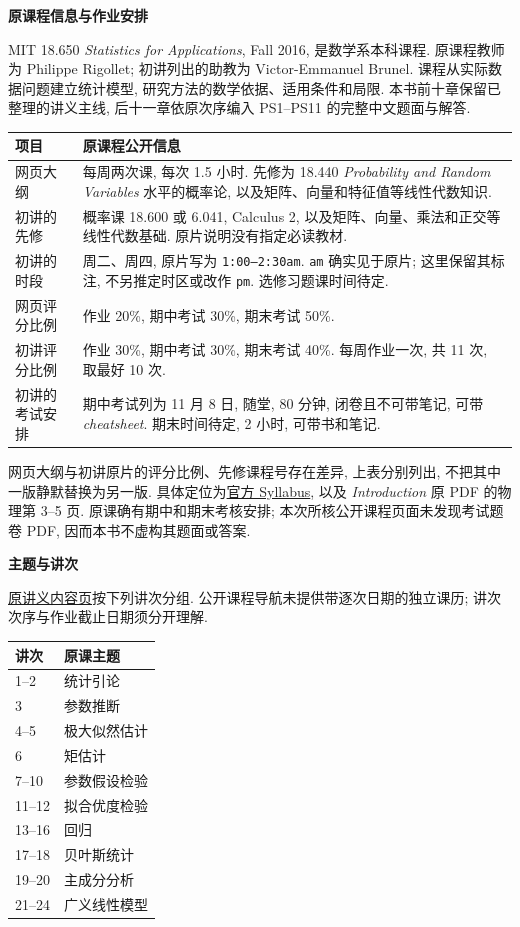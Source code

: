 {}
\noindent\textbf{原课程信息与作业安排}\par
MIT 18.650 \textit{Statistics for Applications}, Fall 2016, 是数学系本科课程. 原课程教师为 Philippe Rigollet; 初讲列出的助教为 Victor-Emmanuel Brunel. 课程从实际数据问题建立统计模型, 研究方法的数学依据、适用条件和局限. 本书前十章保留已整理的讲义主线, 后十一章依原次序编入 PS1--PS11 的完整中文题面与解答.

\begin{longtable}{@{}p{3cm}p{13.8cm}@{}}
\toprule
项目 & 原课程公开信息\\
\midrule
网页大纲 & 每周两次课, 每次 1.5 小时. 先修为 18.440 \textit{Probability and Random Variables} 水平的概率论, 以及矩阵、向量和特征值等线性代数知识.\\
初讲的先修 & 概率课 18.600 或 6.041, Calculus 2, 以及矩阵、向量、乘法和正交等线性代数基础. 原片说明没有指定必读教材.\\
初讲的时段 & 周二、周四, 原片写为 \texttt{1:00--2:30am}. \texttt{am} 确实见于原片; 这里保留其标注, 不另推定时区或改作 \texttt{pm}. 选修习题课时间待定.\\
网页评分比例 & 作业 20\%, 期中考试 30\%, 期末考试 50\%.\\
初讲评分比例 & 作业 30\%, 期中考试 30\%, 期末考试 40\%. 每周作业一次, 共 11 次, 取最好 10 次.\\
初讲的考试安排 & 期中考试列为 11 月 8 日, 随堂, 80 分钟, 闭卷且不可带笔记, 可带 \textit{cheatsheet}. 期末时间待定, 2 小时, 可带书和笔记.\\
\bottomrule
\end{longtable}
网页大纲与初讲原片的评分比例、先修课程号存在差异, 上表分别列出, 不把其中一版静默替换为另一版. 具体定位为\href{https://ocw.mit.edu/courses/18-650-statistics-for-applications-fall-2016/pages/syllabus/}{官方 Syllabus}, 以及 \textit{Introduction} 原 PDF 的物理第 3--5 页. 原课确有期中和期末考核安排; 本次所核公开课程页面未发现考试题卷 PDF, 因而本书不虚构其题面或答案.

\noindent\textbf{主题与讲次}\par
\href{https://ocw.mit.edu/courses/18-650-statistics-for-applications-fall-2016/pages/lecture-slides/}{原讲义内容页}按下列讲次分组. 公开课程导航未提供带逐次日期的独立课历; 讲次次序与作业截止日期须分开理解.
\begin{longtable}{@{}p{2cm}p{14.8cm}@{}}
\toprule
讲次 & 原课主题\\
\midrule
1--2 & 统计引论\\
3 & 参数推断\\
4--5 & 极大似然估计\\
6 & 矩估计\\
7--10 & 参数假设检验\\
11--12 & 拟合优度检验\\
13--16 & 回归\\
17--18 & 贝叶斯统计\\
19--20 & 主成分分析\\
21--24 & 广义线性模型\\
\bottomrule
\end{longtable}

